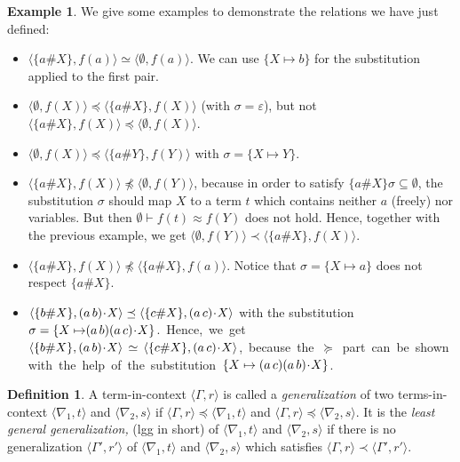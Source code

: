 \documentclass[11pt,a4paper]{amsart}
\theoremstyle{definition}
\newtheorem{definition}{Definition}
\newtheorem{example}{Example}
\newcommand{\swap}[2]{\ensuremath{(#1\, #2)}}
\newcommand{\permap}{{\mkern 1mu\cdot \mkern 1mu}}
\newcommand{\ids}{\varepsilon}
\newcommand{\np}[2]{\langle #1, \allowbreak #2\rangle}
\begin{document}
\begin{example}
We give some examples to demonstrate the relations we have just defined:
\begin{itemize}
\item $\np{\{a\#X\}}{f(a)} \simeq \np{\emptyset}{f(a)}$. We can use $
  \{X\mapsto b\}$ for the substitution applied to the first pair.
\item $\np{\emptyset}{f(X)} \preceq \np{\{a\#X\}}{f(X)}$ (with
  $\sigma=\ids$), but not $\np{\{a\#X\}}{f(X)} \preceq
  \np{\emptyset}{f(X)}$.
\item $\np{\emptyset}{f(X)}\preceq \np{\{a\#Y\}}{f(Y)}$ with $\sigma= \{X\mapsto Y\}$.
\item $\np{\{a\#X\}}{f(X)}\not \preceq \np{\emptyset}{f(Y)}$, because
  in order to satisfy $ \{a\# X\}\sigma \subseteq \emptyset$, the
  substitution $\sigma$ should map $ X$ to a term $ t$ which contains
  neither $a$ (freely) nor variables. But then $ \emptyset \vdash f(t)
  \approx f(Y)$ does not hold.  Hence, together with the previous
  example, we get $\np{\emptyset}{f(Y)}\prec \np{\{a\#X\}}{f(X)}$.
\item $\np{\{a\#X\}}{f(X)} \not\preceq \np{\{a\#X\}}{f(a)}$.  Notice
  that $\sigma=\{{ X\mapsto a}\}$ does not respect $\{{ a\#X}\}$.
\item $\np{\{b\#X\}}{\swap{a}{b}\permap X} \preceq \np{\{c\#X\}}{\swap{a}{c}\permap
  X} $ with the substitution $\sigma=\{ {X\mapsto} \allowbreak \swap{a}{b}\swap{a}{c}\permap
  X\}$.\, Hence,\, we\, get\, $\np{\{b\#X\}}{\swap{a}{b}\permap X}\, \simeq\,
  \np{\{c\#X\}}{\swap{a}{c}\permap X} $,\, because\, the\, $\succeq$\, part\, can\, be\,
  shown\, with\, the\, help\, of\, the\, substitution\, $\{ X\mapsto\allowbreak
    \swap{a}{c}\swap{a}{b}\permap X\}$.
\end{itemize}
\end{example}



\begin{definition}
A term-in-context $\np{\Gamma}{r}$ is called a \emph{generalization} of two terms-in-context $\np{\nabla_1}{t}$ and
$\np{\nabla_2}{s}$ if $\np{\Gamma}{r} \preceq \np{\nabla_1}{t}$
and $\np{\Gamma}{r} \preceq \np{\nabla_2}{s}$. It is the \emph{least
  general generalization,} (lgg in short) of $\np{\nabla_1}{t}$ and $\np{\nabla_2}{s}$ if
there is no generalization $\np{\Gamma'}{r'}$ of $\np{\nabla_1}{t}$
and $\np{\nabla_2}{s}$ which satisfies $\np{\Gamma}{r} \prec
\np{\Gamma'}{r'}$.
\end{definition}
\end{document}

